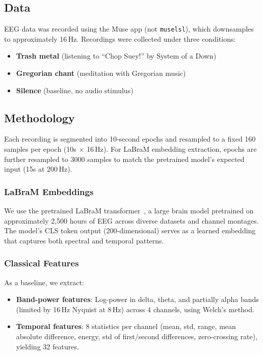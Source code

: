 \documentclass[manuscript,review,anonymous]{acmart}
\begin{document}
\subsection{Data}

EEG data was recorded using the Muse app (not \texttt{muselsl}), which downsamples to approximately 16\,Hz. Recordings were collected under three conditions:
\begin{itemize}[nosep]
  \item \textbf{Trash metal} (listening to ``Chop Suey!'' by System of a Down)
  \item \textbf{Gregorian chant} (meditation with Gregorian music)
  \item \textbf{Silence} (baseline, no audio stimulus)
\end{itemize}

\subsection{Methodology}

Each recording is segmented into 10-second epochs and resampled to a fixed 160 samples per epoch (10s $\times$ 16\,Hz). For LaBraM embedding extraction, epochs are further resampled to 3000 samples to match the pretrained model's expected input (15s at 200\,Hz).

\subsubsection{LaBraM Embeddings}

We use the pretrained LaBraM transformer~\cite{labram}, a large brain model pretrained on approximately 2,500 hours of EEG across diverse datasets and channel montages. The model's CLS token output (200-dimensional) serves as a learned embedding that captures both spectral and temporal patterns.

\subsubsection{Classical Features}

As a baseline, we extract:
\begin{itemize}[nosep]
  \item \textbf{Band-power features}: Log-power in delta, theta, and partially alpha bands (limited by 16\,Hz Nyquist at 8\,Hz) across 4 channels, using Welch's method.
  \item \textbf{Temporal features}: 8 statistics per channel (mean, std, range, mean absolute difference, energy, std of first/second differences, zero-crossing rate), yielding 32 features.
\end{itemize}
\end{document}
